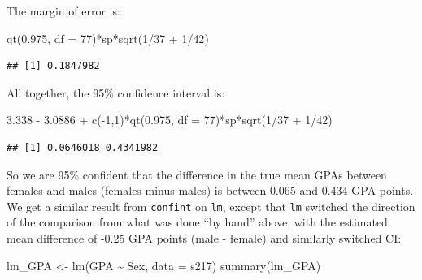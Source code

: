 \documentclass[
]{book}
\newenvironment{Shaded}{\begin{snugshade}}{\end{snugshade}}
\newcommand{\AttributeTok}[1]{\textcolor[rgb]{0.77,0.63,0.00}{#1}}
\newcommand{\DecValTok}[1]{\textcolor[rgb]{0.00,0.00,0.81}{#1}}
\newcommand{\FloatTok}[1]{\textcolor[rgb]{0.00,0.00,0.81}{#1}}
\newcommand{\FunctionTok}[1]{\textcolor[rgb]{0.00,0.00,0.00}{#1}}
\newcommand{\NormalTok}[1]{#1}
\newcommand{\OtherTok}[1]{\textcolor[rgb]{0.56,0.35,0.01}{#1}}
\newcommand{\SpecialCharTok}[1]{\textcolor[rgb]{0.00,0.00,0.00}{#1}}
\begin{document}
The margin of error is:

\begin{Shaded}
\begin{Highlighting}[]
\FunctionTok{qt}\NormalTok{(}\FloatTok{0.975}\NormalTok{, }\AttributeTok{df =} \DecValTok{77}\NormalTok{)}\SpecialCharTok{*}\NormalTok{sp}\SpecialCharTok{*}\FunctionTok{sqrt}\NormalTok{(}\DecValTok{1}\SpecialCharTok{/}\DecValTok{37} \SpecialCharTok{+} \DecValTok{1}\SpecialCharTok{/}\DecValTok{42}\NormalTok{)}
\end{Highlighting}
\end{Shaded}

\begin{verbatim}
## [1] 0.1847982
\end{verbatim}

\newpage

All together, the 95\% confidence interval is:

\begin{Shaded}
\begin{Highlighting}[]
\FloatTok{3.338} \SpecialCharTok{{-}} \FloatTok{3.0886} \SpecialCharTok{+} \FunctionTok{c}\NormalTok{(}\SpecialCharTok{{-}}\DecValTok{1}\NormalTok{,}\DecValTok{1}\NormalTok{)}\SpecialCharTok{*}\FunctionTok{qt}\NormalTok{(}\FloatTok{0.975}\NormalTok{, }\AttributeTok{df =} \DecValTok{77}\NormalTok{)}\SpecialCharTok{*}\NormalTok{sp}\SpecialCharTok{*}\FunctionTok{sqrt}\NormalTok{(}\DecValTok{1}\SpecialCharTok{/}\DecValTok{37} \SpecialCharTok{+} \DecValTok{1}\SpecialCharTok{/}\DecValTok{42}\NormalTok{)}
\end{Highlighting}
\end{Shaded}

\begin{verbatim}
## [1] 0.0646018 0.4341982
\end{verbatim}

So we are 95\% confident that the difference in the true mean GPAs between
females and males (females minus males) is between 0.065 and 0.434 GPA points.
We get a similar result from \texttt{confint} on \texttt{lm}, except that \texttt{lm} switched the direction of the comparison from what was done ``by hand'' above, with the estimated mean difference of -0.25 GPA points (male - female) and similarly switched CI:

\begin{Shaded}
\begin{Highlighting}[]
\NormalTok{lm\_GPA }\OtherTok{\textless{}{-}} \FunctionTok{lm}\NormalTok{(GPA }\SpecialCharTok{\textasciitilde{}}\NormalTok{ Sex, }\AttributeTok{data =}\NormalTok{ s217)}
\FunctionTok{summary}\NormalTok{(lm\_GPA)}
\end{Highlighting}
\end{Shaded}
\end{document}
